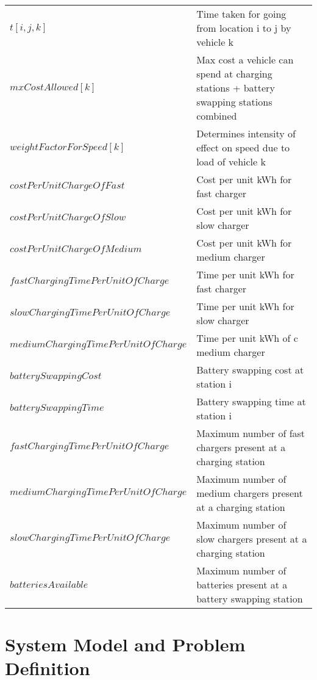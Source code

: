 \documentclass[conference]{IEEEtran}
\begin{document}
\begin{table}[htbp]
{{\begin{tabular}{|l l|}
    $t[i,j,k]$ & Time taken for going  from location i to j by vehicle k \\
     $mxCostAllowed[k]$ & Max cost a vehicle can spend at charging stations + battery swapping stations combined\\
     $weightFactorForSpeed[k]$ & Determines intensity of effect on speed due to load of vehicle k \\
    $costPerUnitChargeOfFast$ & Cost per unit kWh for fast charger\\
    $ costPerUnitChargeOfSlow$ & Cost per unit kWh for slow charger \\
    $ costPerUnitChargeOfMedium$ & Cost per unit kWh for medium charger \\
    $fastChargingTimePerUnitOfCharge$ & Time per unit kWh for  fast charger \\
    $slowChargingTimePerUnitOfCharge$ & Time per unit kWh for slow charger\\
    $ mediumChargingTimePerUnitOfCharge$ & Time per unit kWh of c medium charger \\
    $batterySwappingCost$ & Battery swapping cost at station i \\
    $ batterySwappingTime$ & Battery swapping time at station i \\
    $fastChargingTimePerUnitOfCharge$ & Maximum number of fast chargers present at a charging station \\
    $mediumChargingTimePerUnitOfCharge$ & Maximum number of medium chargers present at a charging station \\
    $slowChargingTimePerUnitOfCharge$ & Maximum number of slow chargers present at a charging station \\
    $ batteriesAvailable$ & Maximum number of batteries present at a battery swapping station  \\ \hline  
    \end{tabular}}}
    \label{Table1}
\end{table}
\vspace{-0.2cm}

\section{System Model and Problem Definition} \label{sec:model} 
\end{document}
